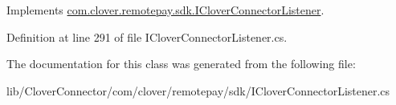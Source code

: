 Implements \hyperlink{interfacecom_1_1clover_1_1remotepay_1_1sdk_1_1_i_clover_connector_listener_adc94ebf628d9ad0bf3f2b537f1de30f2}{com.\+clover.\+remotepay.\+sdk.\+I\+Clover\+Connector\+Listener}.



Definition at line 291 of file I\+Clover\+Connector\+Listener.\+cs.



The documentation for this class was generated from the following file\+:\begin{DoxyCompactItemize}
\item 
lib/\+Clover\+Connector/com/clover/remotepay/sdk/I\+Clover\+Connector\+Listener.\+cs\end{DoxyCompactItemize}
